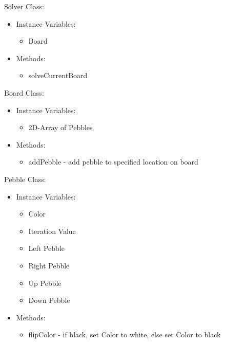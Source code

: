 \documentclass{article}
\begin{document}
\begin{flushleft}
Solver Class:
\end{flushleft}
\begin{itemize}
	\item Instance Variables: 
	\begin{itemize}
  		\item Board
	\end{itemize}
	\item Methods:
	\begin{itemize}
		\item solveCurrentBoard
	\end{itemize}
\end{itemize}
Board Class:
\begin{itemize}
	\item Instance Variables: 
	\begin{itemize}
  		\item 2D-Array of Pebbles
	\end{itemize}
	\item Methods:
	\begin{itemize}
		\item addPebble - add pebble to specified location on board
	\end{itemize}
\end{itemize}
Pebble Class:
\begin{itemize}
	\item Instance Variables: 
	\begin{itemize}
  		\item Color
  		\item Iteration Value
  		\item Left Pebble
  		\item Right Pebble
  		\item Up Pebble
  		\item Down Pebble
	\end{itemize}
	\item Methods:
	\begin{itemize}
		\item flipColor - if black, set Color to white, else set Color to black
	\end{itemize}
\end{itemize}
\end{document}
